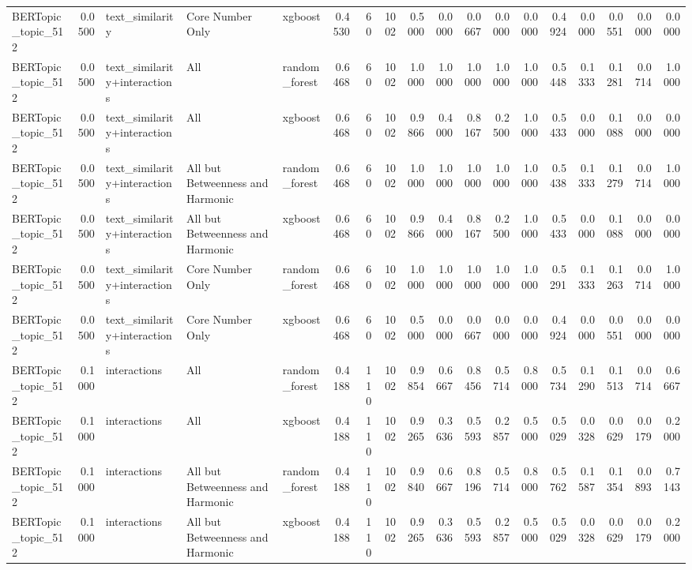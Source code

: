 \begin{tabular}{lrlllrrrrrrrrrrrrr}
BERTopic_topic_512 & 0.0500 & text_similarity & Core Number Only & xgboost & 0.4530 & 60 & 1002 & 0.5000 & 0.0000 & 0.0667 & 0.0000 & 0.0000 & 0.4924 & 0.0000 & 0.0551 & 0.0000 & 0.0000 \\
BERTopic_topic_512 & 0.0500 & text_similarity+interactions & All & random_forest & 0.6468 & 60 & 1002 & 1.0000 & 1.0000 & 1.0000 & 1.0000 & 1.0000 & 0.5448 & 0.1333 & 0.1281 & 0.0714 & 1.0000 \\
BERTopic_topic_512 & 0.0500 & text_similarity+interactions & All & xgboost & 0.6468 & 60 & 1002 & 0.9866 & 0.4000 & 0.8167 & 0.2500 & 1.0000 & 0.5433 & 0.0000 & 0.1088 & 0.0000 & 0.0000 \\
BERTopic_topic_512 & 0.0500 & text_similarity+interactions & All but Betweenness and Harmonic & random_forest & 0.6468 & 60 & 1002 & 1.0000 & 1.0000 & 1.0000 & 1.0000 & 1.0000 & 0.5438 & 0.1333 & 0.1279 & 0.0714 & 1.0000 \\
BERTopic_topic_512 & 0.0500 & text_similarity+interactions & All but Betweenness and Harmonic & xgboost & 0.6468 & 60 & 1002 & 0.9866 & 0.4000 & 0.8167 & 0.2500 & 1.0000 & 0.5433 & 0.0000 & 0.1088 & 0.0000 & 0.0000 \\
BERTopic_topic_512 & 0.0500 & text_similarity+interactions & Core Number Only & random_forest & 0.6468 & 60 & 1002 & 1.0000 & 1.0000 & 1.0000 & 1.0000 & 1.0000 & 0.5291 & 0.1333 & 0.1263 & 0.0714 & 1.0000 \\
BERTopic_topic_512 & 0.0500 & text_similarity+interactions & Core Number Only & xgboost & 0.6468 & 60 & 1002 & 0.5000 & 0.0000 & 0.0667 & 0.0000 & 0.0000 & 0.4924 & 0.0000 & 0.0551 & 0.0000 & 0.0000 \\
BERTopic_topic_512 & 0.1000 & interactions & All & random_forest & 0.4188 & 110 & 1002 & 0.9854 & 0.6667 & 0.8456 & 0.5714 & 0.8000 & 0.5734 & 0.1290 & 0.1513 & 0.0714 & 0.6667 \\
BERTopic_topic_512 & 0.1000 & interactions & All & xgboost & 0.4188 & 110 & 1002 & 0.9265 & 0.3636 & 0.5593 & 0.2857 & 0.5000 & 0.5029 & 0.0328 & 0.0629 & 0.0179 & 0.2000 \\
BERTopic_topic_512 & 0.1000 & interactions & All but Betweenness and Harmonic & random_forest & 0.4188 & 110 & 1002 & 0.9840 & 0.6667 & 0.8196 & 0.5714 & 0.8000 & 0.5762 & 0.1587 & 0.1354 & 0.0893 & 0.7143 \\
BERTopic_topic_512 & 0.1000 & interactions & All but Betweenness and Harmonic & xgboost & 0.4188 & 110 & 1002 & 0.9265 & 0.3636 & 0.5593 & 0.2857 & 0.5000 & 0.5029 & 0.0328 & 0.0629 & 0.0179 & 0.2000 \\

\end{tabular}
